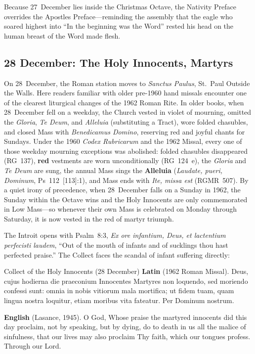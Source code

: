 Because 27~December lies inside the Christmas Octave, the Nativity Preface
overrides the Apostles Preface---reminding the assembly that the eagle who
soared highest into ``In the beginning was the Word'' rested his head on the
human breast of the Word made flesh.

\subsection{28 December: The Holy Innocents, Martyrs}

On 28~December, the Roman station moves to \textit{Sanctus Paulus}, St.~Paul
Outside the Walls. Here readers familiar with older pre-1960 hand missals
encounter one of the clearest liturgical changes of the 1962 Roman Rite. In
older books, when 28~December fell on a weekday, the Church vested in violet of
mourning, omitted the \textit{Gloria}, \textit{Te Deum}, and \textit{Alleluia}
(substituting a Tract), wore folded chasubles, and closed Mass with
\textit{Benedicamus Domino}, reserving red and joyful chants for Sundays. Under
the 1960 \textit{Codex Rubricarum} and the 1962 Missal, every one of those
weekday mourning exceptions was abolished: folded chasubles disappeared
(RG~137), \textbf{red} vestments are worn unconditionally (RG~124~e), the
\textit{Gloria} and \textit{Te Deum} are sung, the annual Mass sings the
\textbf{Alleluia} (\textit{Laudate, pueri, Dominum}, Ps~112~[113]:1), and Mass
ends with \textit{Ite, missa est} (RGMR~507). By a quiet irony of precedence,
when 28~December falls on a Sunday in 1962, the Sunday within the Octave wins
and the Holy Innocents are only commemorated in Low Mass---so whenever their own
Mass is celebrated on Monday through Saturday, it is now vested in the red of
martyr triumph.

The Introit opens with Psalm~8:3, \textit{Ex ore infantium, Deus, et lactentium
perfecisti laudem}, ``Out of the mouth of infants and of sucklings thou hast
perfected praise.'' The Collect faces the scandal of infant suffering directly:

\begin{massbox}{Collect of the Holy Innocents (28 December)}
\textbf{Latin} (1962 Roman Missal). Deus, cujus hodierna die praeconium
Innocentes Martyres non loquendo, sed moriendo confessi sunt: omnia in nobis
vitiorum mala mortifica; ut fidem tuam, quam lingua nostra loquitur, etiam
moribus vita fateatur. Per Dominum nostrum.

\textbf{English} (Lasance, 1945). O God, Whose praise the martyred innocents did
this day proclaim, not by speaking, but by dying, do to death in us all the
malice of sinfulness, that our lives may also proclaim Thy faith, which our
tongues profess. Through our Lord.
\end{massbox}

